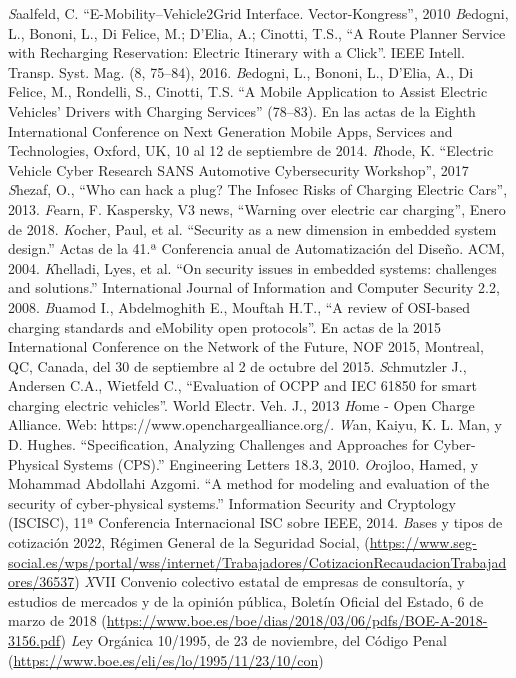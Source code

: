 \documentclass[12pt,a4paper,onecolumn,oneside]{report}
\begin{document}
\begin{thebibliography}{1}
 \textit Saalfeld, C. ``E-Mobility–Vehicle2Grid Interface. Vector-Kongress”, 2010
 \textit Bedogni, L., Bononi, L., Di Felice, M.; D’Elia, A.; Cinotti, T.S., ``A Route Planner Service with Recharging
Reservation: Electric Itinerary with a Click”. IEEE Intell. Transp. Syst. Mag. (8, 75–84), 2016.
 \textit Bedogni, L., Bononi, L., D’Elia, A., Di Felice, M., Rondelli, S., Cinotti, T.S. ``A Mobile Application to Assist
Electric Vehicles’ Drivers with Charging Services” (78–83). En las actas de la Eighth International Conference on Next Generation Mobile Apps, Services and Technologies, Oxford, UK, 10 al 12 de septiembre de 2014.
 \textit Rhode, K. ``Electric Vehicle Cyber Research SANS Automotive Cybersecurity Workshop”, 2017
 \textit Shezaf, O., ``Who can hack a plug? The Infosec Risks of Charging Electric Cars”, 2013.
 \textit Fearn, F. Kaspersky, V3 news, ``Warning over electric car charging”, Enero de 2018.
 \textit Kocher, Paul, et al. ``Security as a new dimension in embedded system design.” Actas de la 41.ª Conferencia anual de Automatización del Diseño. ACM, 2004.
 \textit Khelladi, Lyes, et al. ``On security issues in embedded systems: challenges and solutions.” International Journal of Information and Computer Security 2.2, 2008.
 \textit Buamod I., Abdelmoghith E.,  Mouftah H.T., ``A review of OSI-based charging standards and eMobility open protocols”. En actas de la 2015 International Conference on the Network of the Future, NOF 2015, Montreal, QC, Canada, del 30 de septiembre al 2 de octubre del 2015.
 \textit Schmutzler J., Andersen C.A., Wietfeld C., ``Evaluation of OCPP and IEC 61850 for smart charging electric
vehicles”. World Electr. Veh. J., 2013
 \textit Home - Open Charge Alliance. Web: https://www.openchargealliance.org/.
 \textit Wan, Kaiyu, K. L. Man, y D. Hughes. ``Specification, Analyzing Challenges and Approaches for Cyber-Physical Systems (CPS).” Engineering Letters 18.3, 2010.
 \textit Orojloo, Hamed, y Mohammad Abdollahi Azgomi. ``A method for modeling and evaluation of the security of cyber-physical systems.” Information Security and Cryptology (ISCISC), 11ª Conferencia Internacional ISC sobre IEEE, 2014.
 \textit Bases y tipos de cotización 2022, Régimen General de la Seguridad Social, (\url{https://www.seg-social.es/wps/portal/wss/internet/Trabajadores/CotizacionRecaudacionTrabajadores/36537})
 \textit XVII Convenio colectivo estatal de empresas de consultoría, y estudios de
mercados y de la opinión pública, Boletín Oficial del Estado, 6 de marzo de 2018 (\url{https://www.boe.es/boe/dias/2018/03/06/pdfs/BOE-A-2018-3156.pdf})
 \textit Ley Orgánica 10/1995, de 23 de noviembre, del Código Penal (\url{https://www.boe.es/eli/es/lo/1995/11/23/10/con})

\end{thebibliography}
\end{document}

